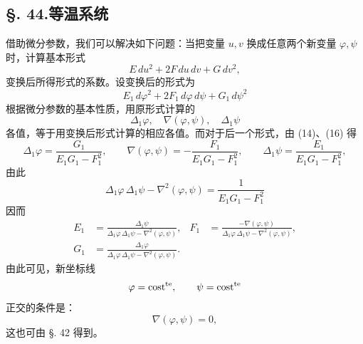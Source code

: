 \subsection*{\S. 44.\quad 等温系统}

借助微分参数，我们可以解决如下问题：当把变量 \(u,v\) 换成任意两个新变量 \(\varphi,\psi\) 时，计算基本形式
\[
 E\,du^2+2F\,du\,dv+G\,dv^2,
\]
变换后所得形式的系数。设变换后的形式为
\[
 E_1\,d\varphi^2+2F_1\,d\varphi\,d\psi+G_1\,d\psi^2
\]
根据微分参数的基本性质，用原形式计算的
\[
 \Delta_1\varphi,
 \quad \nabla(\varphi,\psi),
 \quad \Delta_1\psi
\]
各值，等于用变换后形式计算的相应各值。而对于后一个形式，由 (14)、(16) 得
\[
\Delta_1\varphi=\frac{G_1}{E_1G_1-F_1^2},\qquad
\nabla(\varphi,\psi)=-\frac{F_1}{E_1G_1-F_1^2},\qquad
\Delta_1\psi=\frac{E_1}{E_1G_1-F_1^2},
\]
由此
\[
 \Delta_1\varphi\,\Delta_1\psi-\nabla^2(\varphi,\psi)=\frac{1}{E_1G_1-F_1^2}
\]
因而
\begin{equation}\tag{20}
\begin{aligned}
E_1&=\frac{\Delta_1\psi}{\Delta_1\varphi\,\Delta_1\psi-\nabla^2(\varphi,\psi)},&
F_1&=\frac{-\nabla(\varphi,\psi)}{\Delta_1\varphi\,\Delta_1\psi-\nabla^2(\varphi,\psi)},\\[0.4em]
G_1&=\frac{\Delta_1\varphi}{\Delta_1\varphi\,\Delta_1\psi-\nabla^2(\varphi,\psi)}.
\end{aligned}
\end{equation}
由此可见，新坐标线
\[
 \varphi=\mathrm{cost}^{\mathrm{te}},
 \qquad
 \psi=\mathrm{cost}^{\mathrm{te}}
\]
正交的条件是：
\[
 \nabla(\varphi,\psi)=0,
\]
这也可由 \S. 42 得到。


